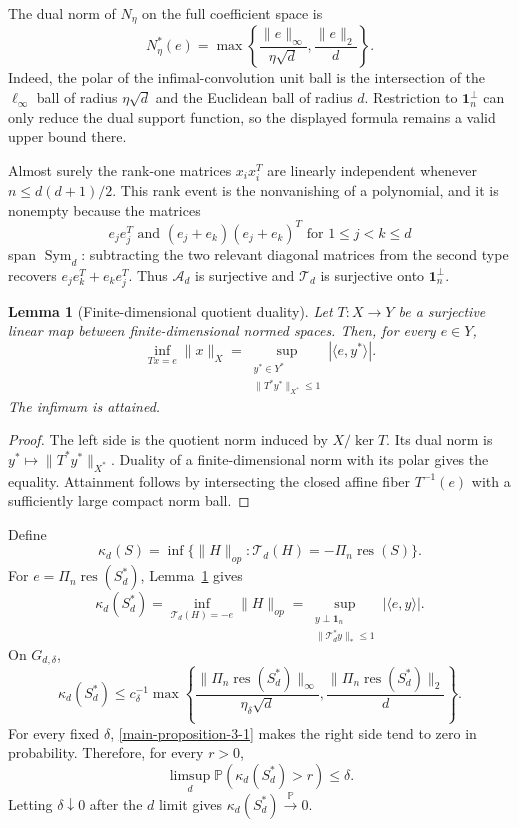\documentclass[11pt]{article}
\numberwithin{equation}{section}
\newtheorem{lemma}[theorem]{Lemma}
\theoremstyle{definition}
\theoremstyle{remark}
\newcommand{\Pp}{\mathbb P}
\newcommand{\1}{\boldsymbol 1}
\newcommand{\cT}{\mathcal T}
\newcommand{\PiZero}{\Pi_n}
\newcommand{\res}{\operatorname{res}}
\newcommand{\rvec}{\res}
\begin{document}
\begin{aiblock}
 
The dual norm of $N_\eta$ on the full coefficient space
is
\[
  N_\eta^*(e)=\max\left\{ \frac{\|e\|_\infty}
  {\eta\sqrt d}, \frac{\|e\|_2}{d} \right\}.
\]
Indeed, the polar of the infimal-convolution unit ball
is the intersection of the $\ell_\infty$ ball of radius
$\eta\sqrt d$ and the Euclidean ball of radius $d$.
Restriction to $\1_n^\perp$ can only reduce the dual
support function, so the displayed formula remains a
valid upper bound there.

Almost surely the rank-one matrices $x_ix_i^T$ are
linearly independent whenever $n\le d(d+1)/2$. This rank
event is the nonvanishing of a polynomial, and it is
nonempty because the matrices
\[
  e_je_j^T\text{ and }(e_j+e_k)(e_j+e_k)^T\text{ for
  }1\le j<k\le d
\]
span $\operatorname{Sym}_d$: subtracting the two
relevant diagonal matrices from the second type recovers
$e_je_k^T+e_ke_j^T$. Thus $\mathcal{A}_d$ is surjective
and $\mathcal{T}_d$ is surjective onto $\1_n^\perp$.

\begin{lemma}[Finite-dimensional quotient
  duality]\label{lem:quotient-duality}
  Let $T:X\to Y$ be a surjective linear map between
  finite-dimensional normed spaces. Then, for every
  $e\in Y$,
  \[
    \inf_{Tx=e}\|x\|_X =\sup_{\substack{y^*\in Y^*\\
    \|T^*y^*\|_{X^*}\le1}} |\langle e,y^*\rangle|.
  \]
  The infimum is attained.
\end{lemma}

\begin{proof}
  The left side is the quotient norm induced by
  $X/\ker T$. Its dual norm is
  $y^*\mapsto\|T^*y^*\|_{X^*}$. Duality of a
  finite-dimensional norm with its polar gives the
  equality. Attainment follows by intersecting the
  closed affine fiber $T^{-1}(e)$ with a sufficiently
  large compact norm ball.
\end{proof}

Define
\[
  \kappa_d(S)=\inf\{\|H\|_{op}:\cT_d(H)=-\PiZero\rvec(S)\}.
\]
For $e=\PiZero\rvec(S_d^*)$,
Lemma~\ref{lem:quotient-duality} gives
\[
  \kappa_d(S_d^*) =\inf_{\mathcal{T}_d(H)=-e}\|H\|_{op}
  =\sup_{\substack{y\perp\1_n\\\|\mathcal{T}_d^*y\|_*
  \le1}} |\langle e,y\rangle|.
\]
On $G_{d,\delta}$,
\[
  \kappa_d(S_d^*) \le c_\delta^{-1} \max\left\{
  \frac{\|\PiZero\rvec(S_d^*)\|_\infty}{\eta_\delta
  \sqrt d}, \frac{\|\PiZero\rvec(S_d^*)\|_2}{d}
  \right\}.
\]
For every fixed $\delta$, \cref{main-proposition-3-1}
makes the right side tend to zero in probability.
Therefore, for every $r>0$,
\[
  \limsup_d\Pp(\kappa_d(S_d^*)>r)\le\delta.
\]
Letting $\delta\downarrow0$ after the $d$ limit gives
$\kappa_d(S_d^*)\xrightarrow{\Pp}0$.


\end{aiblock}
\end{document}
